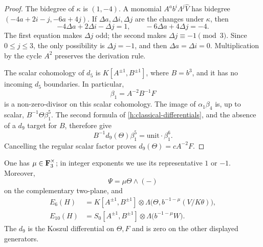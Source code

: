 \begin{proof}
The bidegree of $\kappa$ is $(1,-4)$. A monomial
$A^a b^i\Lambda^j\widehat V$ has bidegree
$(-4a+2i-j,-6a+4j)$. If $\Delta a,\Delta i,\Delta j$ are the changes
under $\kappa$, then
\[
 -4\Delta a+2\Delta i-\Delta j=1,
 \qquad -6\Delta a+4\Delta j=-4.
\]
The first equation makes $\Delta j$ odd; the second makes
$\Delta j\equiv-1\pmod3$. Since $0\leq j\leq3$, the only
possibility is $\Delta j=-1$, and then
$\Delta a=\Delta i=0$. Multiplication by the cycle $A^2$ preserves
the derivation rule.

The scalar cohomology of $d_5$ is
$K[A^{\pm1},B^{\pm1}]$, where $B=b^3$, and it has no incoming
$d_5$ boundaries. In particular,
\[
 \beta_1=A^{-2}B^{-1}F
\]
is a non-zero-divisor on this scalar cohomology. The image of
$\alpha_1\beta_4$ is, up to scalar,
$B^{-1}\Theta\beta_1^5$. The second formula of
\eqref{h:classical-differentials}, and the absence of a $d_9$ target
for $B$, therefore give
\[
 B^{-1}d_9(\Theta)\beta_1^5
   =\text{unit}\cdot\beta_1^6.
\]
Cancelling the regular scalar factor proves
$d_9(\Theta)=cA^{-2}F$.
\end{proof}

\begin{lemma}
 \label{h:mu-and-matrix}
 One has $\mu\in\mathbf F_3^{\times}$; in integer exponents we use its
 representative $1$ or $-1$. Moreover,
 \[
 \Psi=\mu\Theta\wedge(-)
 \]
 on the complementary two-plane, and
 \begin{align}
 \label{h:e6}
 E_6(H)&=K[A^{\pm1},B^{\pm1}]
       \otimes\Lambda\bigl(\Theta,b^{-1-\mu}(V/K\theta)\bigr),\\
 \label{h:e10}
 E_{10}(H)&=S_0[A^{\pm1},B^{\pm1}]
       \otimes\Lambda\bigl(b^{-1-\mu}W\bigr).
 \end{align}
 The $d_9$ is the Koszul differential on $\Theta,F$ and is zero on the
 other displayed generators.
\end{lemma}

